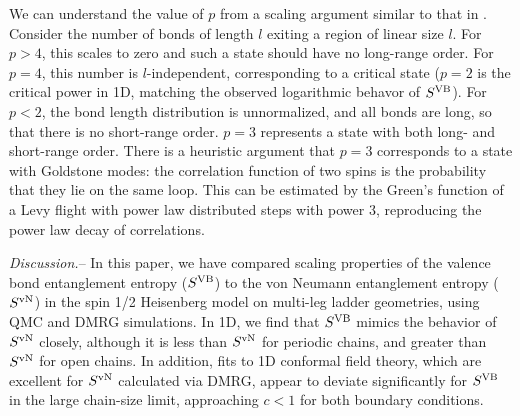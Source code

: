 \documentclass[prl,aps,twocolumn,floatfix,amsmath,amssymb,superscriptaddress,tightenlines]{revtex4}
\begin{document}
We can understand the value of $p$ from a scaling argument similar to that in \cite{network}.
Consider the number of bonds of length $l$ exiting a region of linear size $l$.  For $p>4$, this
scales to zero and such a state should have no long-range order.
For $p=4$, this number is $l$-independent, corresponding to a critical
state ($p=2$ is the critical power in 1D, matching the
observed logarithmic behavor of $S^{\rm VB}$).
For $p<2$, the bond length distribution is unnormalized, and all bonds are long, so that
there is no short-range order.  $p=3$ represents a state with both long-
and short-range order.  There is a heuristic argument that $p=3$ corresponds to a state
with Goldstone modes: the correlation function of two spins is the
probability that they lie on the same loop.  This can be
estimated by
the Green's function of a Levy flight with power law distributed steps with power $3$,
reproducing the power law decay of correlations.



{\it Discussion.}-- In this paper, we have compared scaling properties of
the valence bond entanglement entropy ($S^{\rm VB}$) \cite{Alet,Chh} to the von Neumann entanglement entropy ($S^{ \rm vN}$) in the
spin 1/2 Heisenberg model on multi-leg ladder geometries, using QMC and DMRG simulations.
In 1D, we find
that $S^{\rm VB}$ mimics the behavior of $S^{ \rm vN}$ closely, although 
it is less than $S^{ \rm vN}$ for periodic
chains, and greater than $S^{ \rm vN}$ for open chains. In addition, fits to
1D conformal field theory, which are excellent for $S^{ \rm vN}$ calculated
via DMRG, appear to deviate significantly for $S^{\rm VB}$ in the large
chain-size limit, approaching $c<1$ for both boundary conditions.

\end{document}

